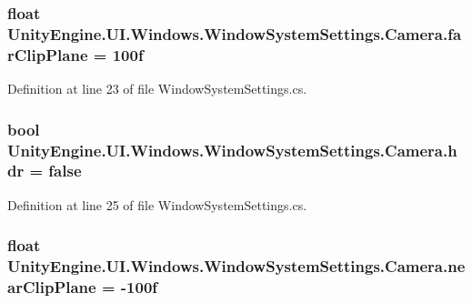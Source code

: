 \subsubsection[{far\+Clip\+Plane}]{\setlength{\rightskip}{0pt plus 5cm}float Unity\+Engine.\+U\+I.\+Windows.\+Window\+System\+Settings.\+Camera.\+far\+Clip\+Plane = 100f}\label{class_unity_engine_1_1_u_i_1_1_windows_1_1_window_system_settings_1_1_camera_a769f49bbdce2913b3d0456f488b4aa70}


Definition at line 23 of file Window\+System\+Settings.\+cs.

\hypertarget{class_unity_engine_1_1_u_i_1_1_windows_1_1_window_system_settings_1_1_camera_a2b8638007f7221b3c19d0965daf58253}{}
\subsubsection[{hdr}]{\setlength{\rightskip}{0pt plus 5cm}bool Unity\+Engine.\+U\+I.\+Windows.\+Window\+System\+Settings.\+Camera.\+hdr = false}\label{class_unity_engine_1_1_u_i_1_1_windows_1_1_window_system_settings_1_1_camera_a2b8638007f7221b3c19d0965daf58253}


Definition at line 25 of file Window\+System\+Settings.\+cs.

\hypertarget{class_unity_engine_1_1_u_i_1_1_windows_1_1_window_system_settings_1_1_camera_aff626d632c59f43a48715787c01d6ebf}{}
\subsubsection[{near\+Clip\+Plane}]{\setlength{\rightskip}{0pt plus 5cm}float Unity\+Engine.\+U\+I.\+Windows.\+Window\+System\+Settings.\+Camera.\+near\+Clip\+Plane = -\/100f}\label{class_unity_engine_1_1_u_i_1_1_windows_1_1_window_system_settings_1_1_camera_aff626d632c59f43a48715787c01d6ebf}


